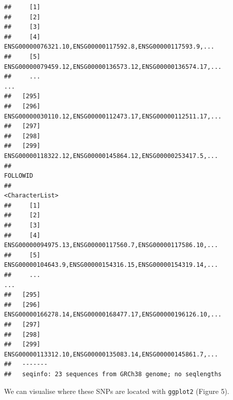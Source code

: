 \documentclass[9pt,a4paper,]{extarticle}
\newenvironment{Shaded}{\begin{snugshade}}{\end{snugshade}}
\newcommand{\KeywordTok}[1]{\textcolor[rgb]{0.13,0.29,0.53}{\textbf{#1}}}
\newcommand{\DataTypeTok}[1]{\textcolor[rgb]{0.13,0.29,0.53}{#1}}
\newcommand{\StringTok}[1]{\textcolor[rgb]{0.31,0.60,0.02}{#1}}
\newcommand{\OperatorTok}[1]{\textcolor[rgb]{0.81,0.36,0.00}{\textbf{#1}}}
\newcommand{\NormalTok}[1]{#1}
\begin{document}
\begin{verbatim}
##     [1]                                                             
##     [2]                                                             
##     [3]                                                             
##     [4]   ENSG00000076321.10,ENSG00000117592.8,ENSG00000117593.9,...
##     [5] ENSG00000079459.12,ENSG00000136573.12,ENSG00000136574.17,...
##     ...                                                          ...
##   [295]                                                             
##   [296] ENSG00000030110.12,ENSG00000112473.17,ENSG00000112511.17,...
##   [297]                                                             
##   [298]                                                             
##   [299]  ENSG00000118322.12,ENSG00000145864.12,ENSG00000253417.5,...
##                                                             FOLLOWID
##                                                      <CharacterList>
##     [1]                                                             
##     [2]                                                             
##     [3]                                                             
##     [4]  ENSG00000094975.13,ENSG00000117560.7,ENSG00000117586.10,...
##     [5]  ENSG00000104643.9,ENSG00000154316.15,ENSG00000154319.14,...
##     ...                                                          ...
##   [295]                                                             
##   [296] ENSG00000166278.14,ENSG00000168477.17,ENSG00000196126.10,...
##   [297]                                                             
##   [298]                                                             
##   [299]  ENSG00000113312.10,ENSG00000135083.14,ENSG00000145861.7,...
##   -------
##   seqinfo: 23 sequences from GRCh38 genome; no seqlengths
\end{verbatim}

We can visualise where these SNPs are located with \texttt{ggplot2} \citep{Wickham2009} (Figure 5).

\begin{Shaded}
\end{Shaded}
\end{document}
